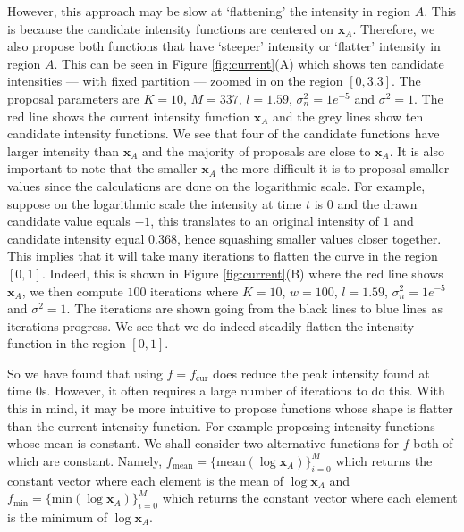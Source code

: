 \documentclass[oneside, 12 pt]{book}
\begin{document}
 However, this approach may be slow at `flattening' the intensity in region $A$. This is because the candidate intensity functions are centered on $\mathbf{x}_A$. Therefore, we also propose both functions that have `steeper' intensity or `flatter' intensity in region $A$. This can be seen in Figure \ref{fig:current}(A) which shows ten candidate intensities --- with fixed partition --- zoomed in on the region $[0,3.3]$. The proposal parameters are $K=10$, $M=337$, $l = 1.59$, $\sigma_n^2 = 1e^{-5}$ and $\sigma^2 = 1$. The red line shows the current intensity function $\mathbf{x}_A$ and the grey lines show ten candidate intensity functions. We see that four of the candidate functions have larger intensity than $\mathbf{x}_A$ and the majority of proposals are close to $\mathbf{x}_A$. It is also important to note that the smaller $\mathbf{x}_A$ the more difficult it is to proposal smaller values since the calculations are done on the logarithmic scale. For example, suppose on the logarithmic scale the intensity at time $t$ is $0$ and the drawn candidate value equals $-1$, this translates to an original intensity of $1$ and candidate intensity equal $0.368$, hence squashing smaller values closer together. This implies that it will take many iterations to flatten the curve in the region $[0,1]$. Indeed, this is shown in Figure \ref{fig:current}(B) where the red line shows $\mathbf{x}_A$, we then compute $100$ iterations where $K=10$, $w=100$, $l = 1.59$, $\sigma_n^2 = 1e^{-5}$ and $\sigma^2 = 1$. The iterations are shown going from the black   lines to blue lines as iterations progress. We see that we do indeed steadily flatten the intensity function in the region $[0,1]$. 
 
 So we have found that using $f = f_{\mathrm{cur}}$ does reduce the peak intensity found at time $0$s. However, it often requires a large number of iterations to do this.  
  With this in mind, it may be more intuitive to propose functions whose shape is flatter than the current intensity function. For example proposing intensity functions whose mean is constant.  We shall consider two alternative functions for $f$ both of which are constant. Namely, $f_{\mathrm{mean}} = \{\mathrm{mean}(\log \mathbf{x}_A)\}^M_{i=0}$ which returns the constant vector where each element is the mean of $\log \mathbf{x}_A$ and $f_{\mathrm{min}} = \{\mathrm{min}(\log \mathbf{x}_A)\}^M_{i=0}$ which returns the constant vector where each element is the minimum of $\log \mathbf{x}_A$. 
  
\end{document}
